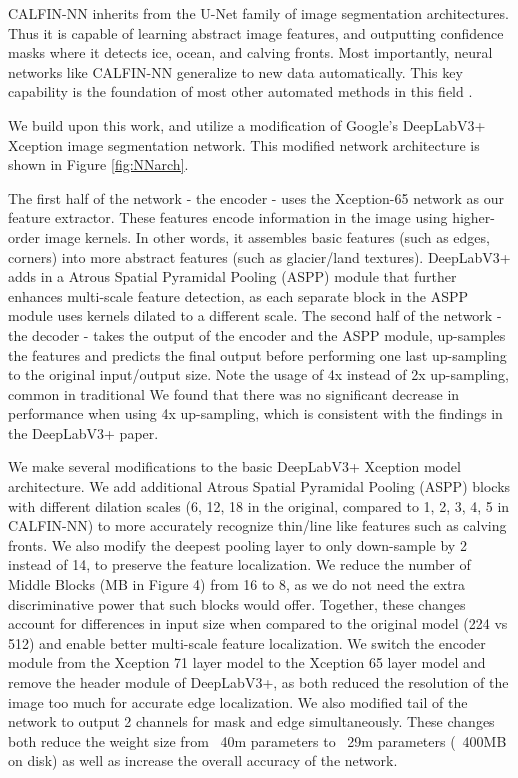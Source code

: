 \documentclass[tc, manuscript]{copernicus}
\begin{document}
CALFIN-NN inherits from the U-Net family of image segmentation architectures. Thus it is capable of learning abstract image features, and outputting confidence masks where it detects ice, ocean, and calving fronts. Most importantly, neural networks like CALFIN-NN generalize to new data automatically. This key capability is the foundation of most other automated methods in this field \citep{zhang2019, mohajerani2019, baumhoer2019}.

We build upon this work, and utilize a modification of Google's DeepLabV3+ Xception \citep{chen2018} image segmentation network. This modified network architecture is shown in Figure \ref{fig:NNarch}. 

The first half of the network - the encoder - uses the Xception-65 network \citep{chollet2016} as our feature extractor. These features encode information in the image using higher-order image kernels. In other words, it assembles basic features (such as edges, corners) into more abstract features (such as glacier/land textures). DeepLabV3+ adds in a Atrous Spatial Pyramidal Pooling (ASPP) module that further enhances multi-scale feature detection, as each separate block in the ASPP module uses kernels dilated to a different scale.
The second half of the network - the decoder - takes the output of the encoder and the ASPP module, up-samples the features and predicts the final output before performing one last up-sampling to the original input/output size. Note the usage of 4x instead of 2x up-sampling, common in traditional  We found that there was no significant decrease in performance when using 4x up-sampling, which is consistent with the findings in the DeepLabV3+ paper\citep{chen2018}.

We make several modifications to the basic DeepLabV3+ Xception model architecture. We add additional Atrous Spatial Pyramidal Pooling (ASPP) blocks with different dilation scales (6, 12, 18 in the original, compared to 1, 2, 3, 4, 5 in CALFIN-NN) to more accurately recognize thin/line like features such as calving fronts. We also modify the deepest pooling layer to only down-sample by 2 instead of 14, to preserve the feature localization. We reduce the number of Middle Blocks (MB in Figure 4) from 16 to 8, as we do not need the extra discriminative power that such blocks would offer. Together, these changes account for differences in input size when compared to the original model (224 vs 512) and enable better multi-scale feature localization. We switch the encoder module from the Xception 71 layer model to the Xception 65 layer model and remove the header module of DeepLabV3+, as both reduced the resolution of the image too much for accurate edge localization. We also modified tail of the network to output 2 channels for mask and edge simultaneously. These changes both reduce the weight size from ~40m parameters to ~29m parameters (~400MB on disk) as well as increase the overall accuracy of the network.
\end{document}
